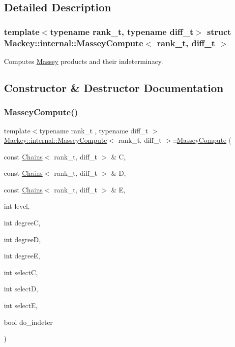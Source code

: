 \subsection{Detailed Description}
\subsubsection*{template$<$typename rank\+\_\+t, typename diff\+\_\+t$>$\newline
struct Mackey\+::internal\+::\+Massey\+Compute$<$ rank\+\_\+t, diff\+\_\+t $>$}

Computes \hyperlink{classMackey_1_1Massey}{Massey} products and their indeterminacy. 

\subsection{Constructor \& Destructor Documentation}
\mbox{\label{structMackey_1_1internal_1_1MasseyCompute_a76235baafddad97e59b165f6ce56fa32}} 
\subsubsection{\texorpdfstring{Massey\+Compute()}{MasseyCompute()}}
{\footnotesize\ttfamily template$<$typename rank\+\_\+t , typename diff\+\_\+t $>$ \\
\hyperlink{structMackey_1_1internal_1_1MasseyCompute}{Mackey\+::internal\+::\+Massey\+Compute}$<$ rank\+\_\+t, diff\+\_\+t $>$\+::\hyperlink{structMackey_1_1internal_1_1MasseyCompute}{Massey\+Compute} (\begin{DoxyParamCaption}\item[{const \hyperlink{classMackey_1_1Chains}{Chains}$<$ rank\+\_\+t, diff\+\_\+t $>$ \&}]{C,  }\item[{const \hyperlink{classMackey_1_1Chains}{Chains}$<$ rank\+\_\+t, diff\+\_\+t $>$ \&}]{D,  }\item[{const \hyperlink{classMackey_1_1Chains}{Chains}$<$ rank\+\_\+t, diff\+\_\+t $>$ \&}]{E,  }\item[{int}]{level,  }\item[{int}]{degreeC,  }\item[{int}]{degreeD,  }\item[{int}]{degreeE,  }\item[{int}]{selectC,  }\item[{int}]{selectD,  }\item[{int}]{selectE,  }\item[{bool}]{do\+\_\+indeter }\end{DoxyParamCaption})}

